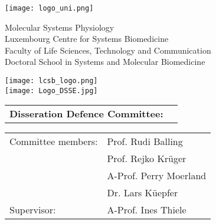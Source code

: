 \begin{center}
\texttt{[image: logo\_uni.png]}

\vspace{20pt}

Molecular Systems Physiology\\
Luxembourg Centre for Systems Biomedicine\\
Faculty of Life Sciences, Technology and Communication\\

\vspace{20pt}
Doctoral School in Systems and Molecular Biomedicine\\

\vspace{20pt}

\vspace{20pt}

 \texttt{[image: lcsb\_logo.png]} \\
  \texttt{[image: Logo\_DSSE.jpg]}
\end{center}

\vfill

\begin{tabular}{l l}
\textbf{Disseration Defence Committee:} &  \\
\end{tabular}

\begin{tabular}{l l}
Committee members: & Prof. Rudi Balling\\
 & Prof. Rejko Kr\"{u}ger\\
 & A-Prof. Perry Moerland\\
 & Dr. Lars K\"{u}epfer\\
 Supervisor: & A-Prof. Ines Thiele\\
\end{tabular}
\newpage
